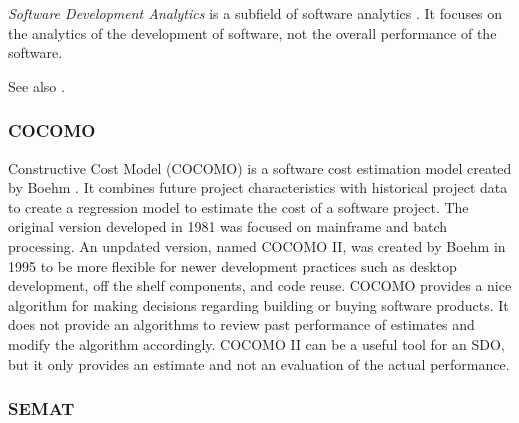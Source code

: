 \documentclass[SDSUThesis.tex]{subfiles}
\begin{document}
\textit{Software Development Analytics} is a subfield of software analytics 
\cite{Menzies2012}.  It focuses on the analytics of the development of software, not
the overall performance of the software.  


See also \cite{Buse2010}.  

\cite{Marcus2010}


\subsubsection{COCOMO}  
    Constructive Cost Model (COCOMO) is a software cost estimation model created
    by Boehm \cite{Boehm1981}.  It combines future project characteristics
    with historical project data to create a regression model to estimate the 
    cost of a software project.  The original version developed in 1981 was
    focused on mainframe and batch processing.  An unpdated version, named
    COCOMO II, was created by Boehm in 1995 to be more flexible for newer 
    development practices such as desktop development, off the shelf components,
    and code reuse.  COCOMO provides a nice algorithm for making decisions
    regarding building or buying software products.  It does not provide 
    an algorithms to review past performance of estimates and modify the
    algorithm accordingly.  COCOMO II can be a useful tool for an SDO,
    but it only provides an estimate and not an evaluation of the actual
    performance.



\subsubsection{SEMAT}
\end{document}
